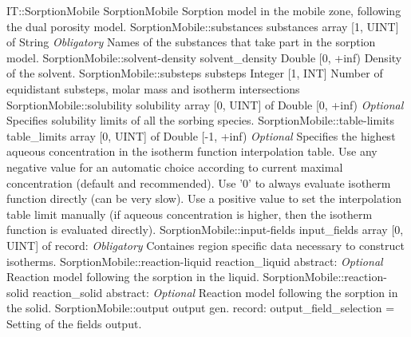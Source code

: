 \begin{RecordType}
	{IT::SorptionMobile}
	{SorptionMobile}
	{}%
	{}%
	{{{Sorption model in the mobile zone, following the dual porosity model.}%
}}
		\RecKey
			{SorptionMobile::substances}
			{substances}
			{{array [1, UINT] of }{String}}{}
			{ \it{Obligatory}}
			{{{Names of the substances that take part in the sorption model.}%
}}
		\RecKey
			{SorptionMobile::solvent-density}
			{solvent{\_}density}
			{{Double [0, +inf)}}{}
			{ }
			{{{Density of the solvent.}%
}}
		\RecKey
			{SorptionMobile::substeps}
			{substeps}
			{{Integer [1, INT]}}{}
			{ }
			{{{Number of equidistant substeps, molar mass and isotherm intersections}%
}}
		\RecKey
			{SorptionMobile::solubility}
			{solubility}
			{{array [0, UINT] of }{Double [0, +inf)}}{}
			{ \it{Optional}}
			{{{Specifies solubility limits of all the sorbing species.}%
}}
		\RecKey
			{SorptionMobile::table-limits}
			{table{\_}limits}
			{{array [0, UINT] of }{Double [-1, +inf)}}{}
			{ \it{Optional}}
			{{{Specifies the highest aqueous concentration in the isotherm function interpolation table.
Use any negative value for an automatic choice according to current maximal concentration (default and recommended). Use '0' to always evaluate isotherm function directly (can be very slow). Use a positive value to set the interpolation table limit manually (if aqueous concentration is higher, then the isotherm function is evaluated directly).}%
}}
		\RecKey
			{SorptionMobile::input-fields}
			{input{\_}fields}
			{{array [0, UINT] of }{record: }}{}
			{ \it{Obligatory}}
			{{{Containes region specific data necessary to construct isotherms.}%
}}
		\RecKey
			{SorptionMobile::reaction-liquid}
			{reaction{\_}liquid}
			{{abstract: }}{}
			{ \it{Optional}}
			{{{Reaction model following the sorption in the liquid.}%
}}
		\RecKey
			{SorptionMobile::reaction-solid}
			{reaction{\_}solid}
			{{abstract: }}{}
			{ \it{Optional}}
			{{{Reaction model following the sorption in the solid.}%
}}
		\RecKey
			{SorptionMobile::output}
			{output}
			{{gen. record: }}{{output{\_}field{\_}selection}{ = }}
			{ }
			{{{Setting of the fields output.}%
}}
\end{RecordType}
